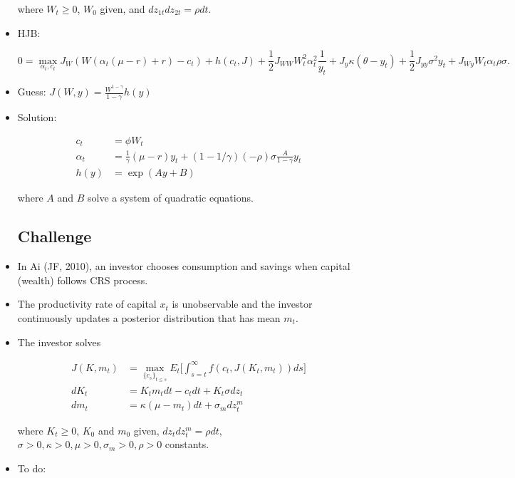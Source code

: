 \documentclass{article}
\begin{document}
\begin{itemize}
where $W_t \ge 0$, $W_0$ given, and $dz_{1t}dz_{2t} = \rho dt$.

\item HJB:

$$
0 = \max_{\alpha_t, c_t} J_W (W (\alpha_t(\mu - r) + r) -c_t) + h(c_t, J) + \frac{1}{2} J_{WW} W_t^2 \alpha_t^2 \frac{1}{y_t} + J_y \kappa(\theta - y_t) + \frac{1}{2} J_{yy} \sigma^2 y_t + J_{Wy} W_t \alpha_t \rho \sigma.
$$

\item Guess: $J(W, y) = \frac{W^{1-\gamma}}{1-\gamma} h(y)$

\item Solution: 

\begin{align*}
c_t &= \phi W_t \\
\alpha_t &= \frac{1}{\gamma}(\mu - r)y_t + (1- 1/\gamma)(-\rho)\sigma \frac{A}{1- \gamma} y_t \\
h(y) &= \exp(Ay + B)
\end{align*}

where $A$ and $B$ solve a system of quadratic equations.

\subsection*{Challenge}

\item In Ai (JF, 2010), an investor chooses consumption and savings when capital (wealth) follows CRS process. 

\item The productivity rate of capital $x_t$ is unobservable and the investor continuously updates a posterior distribution that has mean $m_t$.

\item The investor solves

\begin{align*}
J(K, m_t) &= \max_{\{c_s\}_{t \le s}} E_t \Bigg[ \int_{s=t}^\infty f(c_t, J(K_t, m_t)) ds \Bigg] \\
dK_t &= K_t m_t dt - c_t dt + K_t \sigma dz_t \\
dm_t &= \kappa(\mu - m_t) dt + \sigma_m dz^m_t
\end{align*}

where $K_t \ge 0$, $K_0$ and $m_0$ given, $dz_t dz^m_t = \rho dt$, $\sigma > 0, \kappa > 0, \mu > 0, \sigma_m > 0, \rho > 0$ constants.


\item To do:


\end{itemize}
\end{document}
